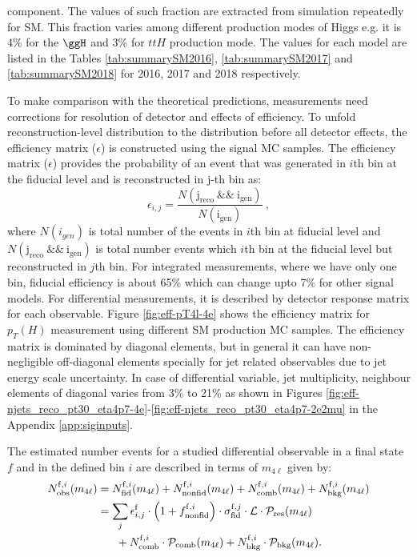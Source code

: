 component. The values of such fraction are extracted from simulation repeatedly for SM. This fraction varies among different production modes of Higgs e.g. it is  4\%  for the $\ggH$ and 3\% for $ttH$ production mode. The values for each model are listed in the Tables \ref{tab:summarySM2016},  \ref{tab:summarySM2017} and  \ref{tab:summarySM2018} for 2016, 2017 and 2018 respectively. %
\par  
To make comparison with the  theoretical predictions, measurements need corrections for resolution of detector and effects of efficiency. To unfold 
reconstruction-level distribution to the distribution before all detector effects, the efficiency matrix ($\epsilon$) is constructed using the signal
MC samples. The efficiency matrix ($\epsilon$) provides the probability of an event that was generated in $i$th bin at the fiducial level and is reconstructed 
in j-th bin as:
\begin{equation}
\epsilon_{i,j} = \frac{N(\mathrm{j_{reco}} ~\&\&~ \mathrm{i_{gen}})}{N(\mathrm{i_{gen}})}\ ,
\end{equation}
where $N(i_{gen})$ is total number of the events in $i$th bin at fiducial level and $N(\mathrm{j_{reco}} ~\&\&~ \mathrm{i_{gen}})$ is total number events which $i$th bin at the fiducial level but reconstructed in $j$th bin. For integrated measurements, where we have only one bin, fiducial efficiency is 
about 65\% which can change upto 7\% for other signal models. For differential measurements, it is described by detector response matrix for each observable.
Figure \ref{fig:eff-pT4l-4e} shows the efficiency matrix for $p_{T}(H)$  measurement using different SM production MC samples. The efficiency matrix is
dominated by diagonal elements, but in general it can have non-negligible off-diagonal elements specially for jet related observables due to
jet energy scale uncertainty. In case of differential variable, jet multiplicity,  neighbour elements of diagonal varies from 3\% to 21\% as shown in Figures
\ref{fig:eff-njets_reco_pt30_eta4p7-4e}-\ref{fig:eff-njets_reco_pt30_eta4p7-2e2mu} in the Appendix \ref{app:siginputs}.
\par The estimated number events for a studied differential observable in a final state $f$ and in the defined bin $i$ are described in terms of $m_{4\ell}$ given by:
\begin{eqnarray}
\label{eqn:m4l}
\begin{aligned}
N_{\mathrm{obs}}^{\mathrm{f},i}(m_{4\ell}) &= N_{\mathrm{fid}}^{\mathrm{f},i}(m_{4\ell})+N_{\mathrm{nonfid}}^{\mathrm{f},i}(m_{4\ell})+N_{\mathrm{comb}}^{\mathrm{f},i}(m_{4\ell})+N_{\mathrm{bkg}}^{\mathrm{f},i}(m_{4\ell}) \\
&=\sum_{j} \epsilon_{i,j}^{\mathrm{f}} \cdot \left(1+f_{\rm nonfid}^{\mathrm{f},i} \right)\cdot\sigma_{\mathrm{fid}}^{\mathrm{f},j} \cdot \mathcal{L}\cdot\mathcal{P}_{\mathrm{res}}(m_{4\ell}) \\
&~~~~~+ N_{\mathrm{comb}}^{\mathrm{f},i}\cdot\mathcal{P}_{\mathrm{comb}}(m_{4\ell})+N_{\mathrm{bkg}}^{\mathrm{f},i}\cdot\mathcal{P}_{\mathrm{bkg}}(m_{4\ell}).
\end{aligned}
\end{eqnarray}

